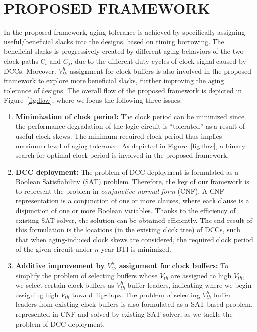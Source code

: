 \section{PROPOSED FRAMEWORK}
\label{sec:framework}
In the proposed framework, aging tolerance is achieved by specifically assigning useful/beneficial slacks into the designs, based on timing borrowing. The beneficial slacks is progressively created by different aging behaviors of the two clock paths $C_{i}$ and $C_{j}$, due to the different duty cycles of clock signal caused by DCCs. Moreover, $V_{th}^h$ assignment for clock buffers is also involved in the proposed framework to explore more beneficial slacks, further improving the aging tolerance of designs.
The overall flow of the proposed framework is depicted in Figure~\ref{fig:flow}, where we focus the following three issues:
\begin{enumerate}[leftmargin=*]
	\item \textbf{Minimization of clock period:} The clock period can be minimized since the performance degradation of the logic circuit is \enquote{tolerated} as a result of useful clock skews. The minimum required clock period thus implies maximum level of aging tolerance. As depicted in Figure~\ref{fig:flow}, a binary search for optimal clock period is involved in the proposed framework.
	\item \textbf{DCC deployment:} The problem of  DCC deployment is formulated as a Boolean Satisfiability (SAT) problem. Therefore, the key of our framework is to represent the problem in \textit{conjunctive normal form} (CNF). A CNF representation is a conjunction of one or more clauses, where each clause is a disjunction of one or more Boolean variables. Thanks to the efficiency of existing SAT solver, the solution can be obtained efficiently. The end result of this formulation is the locations (in the existing clock tree) of DCCs, such that when aging-induced clock skews are considered, the required clock period of the given circuit under $n$-year BTI is minimized. 
	\item \textbf{Additive improvement by $V_{th}^h$ assignment for clock buffers:} To simplify the problem of selecting buffers whose $V_{th}$ are assigned to high $V_{th}$, we select certain clock buffers as $V_{th}^h$ buffer leaders, indicating where we begin assigning high $V_{th}$ toward flip-flops. The problem of selecting $V_{th}^h$ buffer leaders from existing clock buffers is also formulated as a SAT-based problem, represented in CNF and solved by existing SAT solver, as we tackle the problem of DCC deployment.
\end{enumerate}


